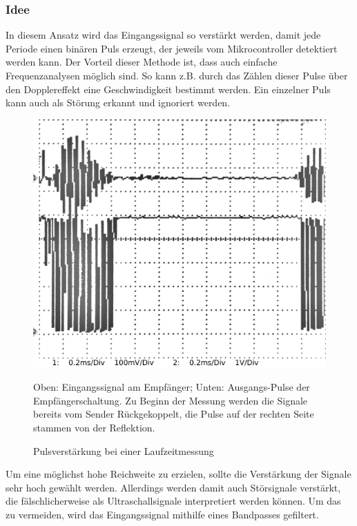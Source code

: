 \subsubsection{Idee}
In diesem Ansatz wird das Eingangssignal so verstärkt werden, damit jede Periode einen binären Puls erzeugt, der jeweils vom Mikrocontroller detektiert werden kann. Der Vorteil dieser Methode ist, dass auch einfache Frequenzanalysen möglich sind. So kann z.B. durch das Zählen dieser Pulse über den Dopplereffekt eine Geschwindigkeit bestimmt werden. Ein einzelner Puls kann auch als Störung erkannt und ignoriert werden.\\
\begin{figure}[H]
\centering
\includegraphics[width=(\textwidth), angle=0]{oszi/15-04-23/4_03.png}
\caption{Pulsverstärkung bei einer Laufzeitmessung} \label{img:I11}
Oben: Eingangssignal am Empfänger; Unten: Ausgangs-Pulse der Empfängerschaltung. Zu Beginn der Messung werden die Signale bereits vom Sender Rückgekoppelt, die Pulse auf der rechten Seite stammen von der Reflektion.
\end{figure}
Um eine möglichst hohe Reichweite zu erzielen, sollte die Verstärkung der Signale sehr hoch gewählt werden. Allerdings werden damit auch Störsignale verstärkt, die fälschlicherweise als Ultraschallsignale interpretiert werden können. Um das zu vermeiden, wird das Eingangssignal mithilfe eines Bandpasses gefiltert.


